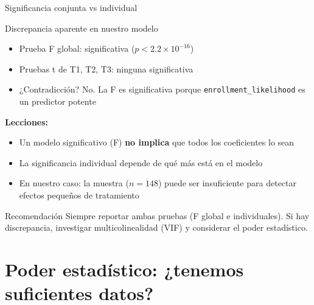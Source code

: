 \documentclass[aspectratio=169, 11pt]{beamer}
\begin{document}
\begin{frame}{Significancia conjunta vs individual}
\begin{alertblock}{Discrepancia aparente en nuestro modelo}
\small
\begin{itemize}
  \item Prueba F global: significativa ($p < 2.2 \times 10^{-16}$)
  \item Pruebas t de T1, T2, T3: ninguna significativa
  \item ¿Contradicción? No. La F es significativa porque \texttt{enrollment\_likelihood} es un predictor potente
\end{itemize}
\end{alertblock}

\vspace{0.1cm}
\textbf{Lecciones:}
\begin{itemize}
  \item Un modelo significativo (F) \textbf{no implica} que todos los coeficientes lo sean
  \item La significancia individual depende de qué más está en el modelo
  \item En nuestro caso: la muestra ($n = 148$) puede ser insuficiente para detectar efectos pequeños de tratamiento
\end{itemize}

\vspace{0.1cm}
\begin{block}{Recomendación}
Siempre reportar ambas pruebas (F global e individuales). Si hay discrepancia, investigar multicolinealidad (VIF) y considerar el poder estadístico.
\end{block}
\end{frame}

\section{Poder estadístico: ¿tenemos suficientes datos?}
\end{document}

